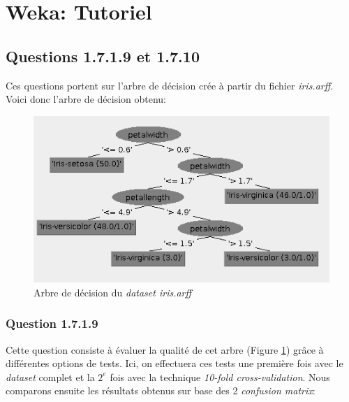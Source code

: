 \documentclass[10pt,a4paper]{article}
\begin{document}
   	
   	\section{Weka: Tutoriel}
   	
	   	\subsection{Questions 1.7.1.9 et 1.7.10}
		   	Ces questions portent sur l'arbre de décision crée à partir du fichier \textit{iris.arff}. Voici donc l'arbre de décision obtenu:
		   	
		   	\begin{figure}[h]
		   		\begin{center}
		   			\includegraphics[width=0.3\linewidth]{IrisTree}
		   		\end{center}
		   		\caption{Arbre de décision du \textit{dataset iris.arff}}
		   		\label{fig-Iris-tree}
		   	\end{figure}
		   	\subsubsection*{Question 1.7.1.9}
			   	Cette question consiste à évaluer la qualité de cet arbre (Figure \ref{fig-Iris-tree}) grâce à différentes options de tests. Ici, on effectuera ces tests une première fois avec le \textit{dataset} complet et la $2^{e}$ fois avec la technique \textit{10-fold cross-validation}. Nous comparons ensuite les résultats obtenus sur base des 2 \textit{confusion matrix}:\\
	   			
\end{document}
